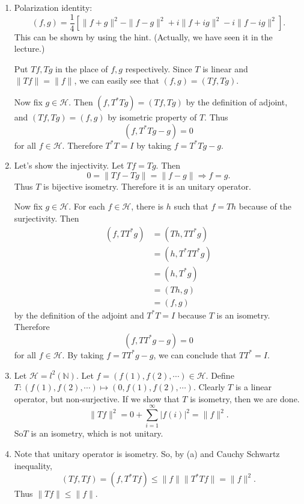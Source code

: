 \begin{exercise}[4.22] \hfill

	\begin{enumerate}[label = (\alph*)]
		\item Polarization identity:
			\[
				(f, g) = \frac{1}{4}\left[ \| f+ g\|^2 - \|f-g\|^2 + i\|f+ig\|^2 - i\|f-ig\|^2 \right].
			\]
			This can be shown by using the hint. (Actually, we have seen it in the lecture.)
			
			Put $Tf, Tg$ in the place of $f, g$ respectively.
			Since $T$ is linear and $\| Tf \| = \|f \|$, we can easily see that $(f, g) = (Tf, Tg)$.

			Now fix $g\in \mathcal{H}$.
			Then $(f, T^*Tg) = (Tf, Tg)$ by the definition of adjoint,
			and $(Tf, Tg) = (f, g)$ by isometric property of $T$.
			Thus
			\[
				(f, T^* Tg - g) = 0
			\]
			for all $f \in \mathcal{H}$.
			Therefore $T^* T = I$ by taking $f = T^* T g - g$.

		\item Let's show the injectivity.
			Let $Tf= Tg$.
			Then
			\[
				0 = \| Tf - Tg \| = \|f - g \| \Rightarrow f = g.
			\]
			Thus $T$ is bijective isometry.
			Therefore it is an unitary operator.

			Now fix $g\in \mathcal{H}$.
			For each $f\in \mathcal{H}$, there is $h$ such that $f = Th$ because of the surjectivity.
			Then
			\[
				\begin{split}
					(f, TT^* g)
					&= (Th, TT^* g) \\
					&= (h, T^* T T^* g) \\
					&= (h, T^* g) \\
					&= (Th, g) \\
					&= (f, g)
				\end{split}
			\]
			by the definition of the adjoint and $T^* T = I$ because $T$ is an isometry.
			Therefore
			\[
				(f, TT^* g - g) = 0
			\]
			for all $f \in \mathcal{H}$.
			By taking $f = TT^*g - g$, we can conclude that $TT^* = I$.

		\item Let $\mathcal{H} = l^2(\mathbb{N})$.
			Let $f = (f(1), f(2), \cdots) \in \mathcal{H}$.
			Define $T: (f(1), f(2), \cdots) \mapsto (0, f(1), f(2), \cdots)$.
			Clearly $T$ is a linear operator, but non-surjective.
			If we show that $T$ is isometry, then we are done.
			\[
				\| Tf \|^2 = 0 + \sum_{i=1}^\infty |f(i)|^2 = \| f \|^2.
			\]
			So$T$ is an isometry, which is not unitary.

		\item Note that unitary operator is isometry.
			So, by (a) and Cauchy Schwartz inequality,
			\[
				(Tf, Tf) = (f, T^* Tf) \le \| f \| \| T^* T f \| = \| f \|^2.
			\]
			Thus $\| Tf \| \le \| f\|$.


\end{enumerate}
\end{exercise}
